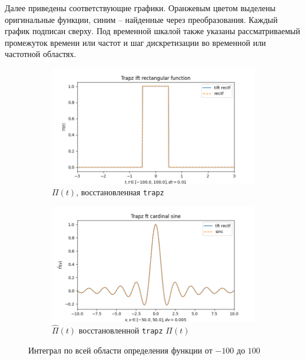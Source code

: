 \documentclass[a4paper, 12pt]{article}
\begin{document}
    Далее приведены соответствующие графики. Оранжевым цветом выделены оригинальные функции, синим --
    найденные через преобразования. Каждый график подписан сверху. Под временной шкалой также указаны
    рассматриваемый промежуток времени или частот и шаг дискретизации во временной или частотной областях.
    \begin{figure}[H]
        \centering
        \begin{subfigure}{0.45\textwidth}
            \centering
            \includegraphics[width=\linewidth]{1_tiftr.png}
            \caption{$\Pi(t)$, восстановленная \texttt{trapz}}
            \label{fig:trectf1}
        \end{subfigure}
        \hspace{5mm}
        \begin{subfigure}{0.45\textwidth}
            \centering
            \includegraphics[width=\linewidth]{1_tftr.png}
            \caption{$\hat{\Pi}(t)$ восстановленной \texttt{trapz} $\Pi(t)$}
            \label{fig:tsinc1}
        \end{subfigure}
        \caption{Интеграл по всей области определения функции от $-100$ до $100$}
        \label{fig:trapzs1}
    \end{figure}
\end{document}
